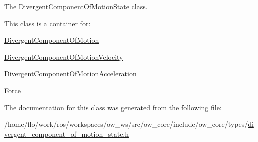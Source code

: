 The \hyperlink{classow__core_1_1DivergentComponentOfMotionState}{Divergent\+Component\+Of\+Motion\+State} class. 

This class is a container for\+:
\begin{DoxyItemize}
\item \hyperlink{classow__core_1_1DivergentComponentOfMotion}{Divergent\+Component\+Of\+Motion}
\item \hyperlink{classow__core_1_1DivergentComponentOfMotionVelocity}{Divergent\+Component\+Of\+Motion\+Velocity}
\item \hyperlink{classow__core_1_1DivergentComponentOfMotionAcceleration}{Divergent\+Component\+Of\+Motion\+Acceleration}
\item \hyperlink{classow__core_1_1Force}{Force} 
\end{DoxyItemize}

The documentation for this class was generated from the following file\+:\begin{DoxyCompactItemize}
\item 
/home/flo/work/ros/workspaces/ow\+\_\+ws/src/ow\+\_\+core/include/ow\+\_\+core/types/\hyperlink{divergent__component__of__motion__state_8h}{divergent\+\_\+component\+\_\+of\+\_\+motion\+\_\+state.\+h}\end{DoxyCompactItemize}
